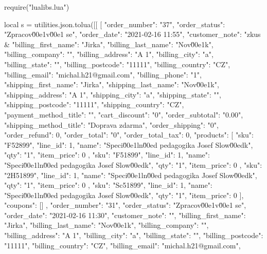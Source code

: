 \documentclass[landscape,a4page]{article}
\begin{document}
\columnseprule=0.3pt
\columnsep=20pt
\parindent=0pt
\parskip=4pt
\begin{multicols*}{3}

\begin{luacode*}
require("lualibs.lua")

local s =  utilities.json.tolua([[
[
{
    "order_number": "37",
    "order_status": "Zpracov\u00e1v\u00e1 se",
    "order_date": "2021-02-16 11:55",
    "customer_note": "zkus &%
    "billing_first_name": "Jirka",
    "billing_last_name": "Nov\u00e1k",
    "billing_company": "",
    "billing_address": "A 1",
    "billing_city": "a",
    "billing_state": "",
    "billing_postcode": "11111",
    "billing_country": "CZ",
    "billing_email": "michal.h21@gmail.com",
    "billing_phone": "1",
    "shipping_first_name": "Jirka",
    "shipping_last_name": "Nov\u00e1k",
    "shipping_address": "A 1",
    "shipping_city": "a",
    "shipping_state": "",
    "shipping_postcode": "11111",
    "shipping_country": "CZ",
    "payment_method_title": "",
    "cart_discount": "0",
    "order_subtotal": "0.00",
    "shipping_method_title": "Doprava zdarma",
    "order_shipping": "0",
    "order_refund": 0,
    "order_total": "0",
    "order_total_tax": 0,
    "products": [
        {
            "sku": "F52899",
            "line_id": 1,
            "name": "Speci\u00e1ln\u00ed pedagogika \/ Josef Slow\u00edk",
            "qty": "1",
            "item_price": 0
        },
        {
            "sku": "F51899",
            "line_id": 1,
            "name": "Speci\u00e1ln\u00ed pedagogika \/ Josef Slow\u00edk",
            "qty": "1",
            "item_price": 0
        },
        {
            "sku": "2H51899",
            "line_id": 1,
            "name": "Speci\u00e1ln\u00ed pedagogika \/ Josef Slow\u00edk",
            "qty": "1",
            "item_price": 0
        },
        {
            "sku": "Sc51899",
            "line_id": 1,
            "name": "Speci\u00e1ln\u00ed pedagogika \/ Josef Slow\u00edk",
            "qty": "1",
            "item_price": 0
        }
    ],
    "coupons": []
},
{
    "order_number": "31",
    "order_status": "Zpracov\u00e1v\u00e1 se",
    "order_date": "2021-02-16 11:30",
    "customer_note": "",
    "billing_first_name": "Jirka",
    "billing_last_name": "Nov\u00e1k",
    "billing_company": "",
    "billing_address": "A 1",
    "billing_city": "a",
    "billing_state": "",
    "billing_postcode": "11111",
    "billing_country": "CZ",
    "billing_email": "michal.h21@gmail.com",
}
\end{luacode*}
\end{multicols*}
\end{document}
